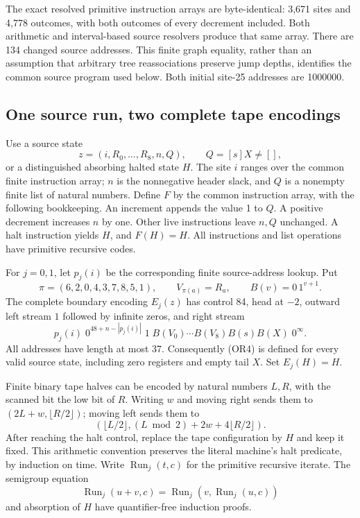 The exact resolved primitive instruction arrays are byte-identical:
3,671 sites and 4,778 outcomes, with both outcomes of every decrement
included.  Both arithmetic and interval-based source resolvers produce
that same array.  There are 134 changed source addresses.  This finite
graph equality, rather than an assumption that arbitrary tree
reassociations preserve jump depths, identifies the common source
program used below.  Both initial site-25 addresses are 1000000.

\subsection{One source run, two complete tape encodings}

Use a source state
\[
 z=(i,R_0,\ldots,R_8,n,Q),\qquad Q=[s]X\ne[],
\]
or a distinguished absorbing halted state $H$.  The site $i$ ranges
over the common finite instruction array; $n$ is the nonnegative
header slack, and $Q$ is a nonempty finite list of natural numbers.
Define $F$ by the common instruction array, with the following
bookkeeping.  An increment appends the value 1 to $Q$.  A positive
decrement increases $n$ by one.  Other live instructions leave $n,Q$
unchanged.  A halt instruction yields $H$, and $F(H)=H$.
All instructions and list operations have primitive recursive codes.

For $j=0,1$, let $p_j(i)$ be the corresponding finite source-address
lookup.  Put
\[
 \pi=(6,2,0,4,3,7,8,5,1),\qquad V_{\pi(a)}=R_a,
 \qquad B(v)=0\,1^{v+1}.
\]
The complete boundary encoding $E_j(z)$ has control 84, head at
$-2$, outward left stream $1$ followed by infinite zeros, and right
stream
\[
 p_j(i)\;0^{48+n-|p_j(i)|}\;1\;
 B(V_0)\cdots B(V_8)B(s)B(X)\;0^\infty.
 \tag{OR4}
\]
All addresses have length at most 37.  Consequently (OR4) is defined
for every valid source state, including zero registers and empty
tail $X$.  Set $E_j(H)=H$.

Finite binary tape halves can be encoded by natural numbers $L,R$,
with the scanned bit the low bit of $R$.  Writing $w$ and moving
right sends them to $(2L+w,\lfloor R/2\rfloor)$; moving left sends
them to
\[
 (\lfloor L/2\rfloor,
  (L\bmod2)+2w+4\lfloor R/2\rfloor).
\]
After reaching the halt control, replace the tape configuration by
$H$ and keep it fixed.  This arithmetic convention preserves the
literal machine's halt predicate, by induction on time.  Write
$\operatorname{Run}_j(t,c)$ for the primitive recursive iterate.
The semigroup equation
\[
 \operatorname{Run}_j(u+v,c)
  =\operatorname{Run}_j(v,\operatorname{Run}_j(u,c))
 \tag{OR5}
\]
and absorption of $H$ have quantifier-free induction proofs.

